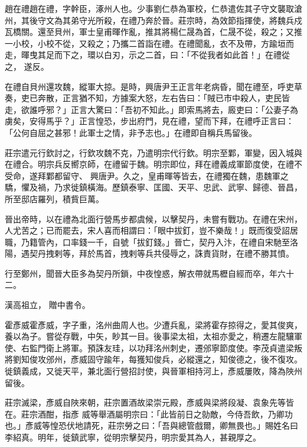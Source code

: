 
\begin{pinyinscope}

 趙在禮趙在禮，字幹臣，涿州人也。少事劉仁恭為軍校，仁恭遣佐其子守文襲取滄州，其後守文為其弟守光所殺，在禮乃奔於晉。莊宗時，為效節指揮使，將魏兵戍瓦橋關。還至貝州，軍士皇甫暉作亂，推其將楊仁晟為首，仁晟不從，殺之；又推一小校，小校不從，又殺之；乃攜二首詣在禮。在禮聞亂，衣不及帶，方踰垣而走，暉曳其足而下之，環以白刃，示之二首，曰：「不從我者如此首！」在禮從之，
 遂反。



 在禮自貝州還攻魏，縱軍大掠。是時，興唐尹王正言年老病昏，聞在禮至，呼吏草奏，吏已奔散，正言猶不知，方據案大怒，左右告曰：「賊已市中殺人，吏民皆走，欲誰呼邪？」正言大驚曰：「吾初不知此。」即索馬將去，廄吏曰：「公妻子為虜矣，安得馬乎？」正言惶恐，步出府門，見在禮，望而下拜，在禮呼正言曰：「公何自屈之甚邪！此軍士之情，非予志也。」在禮即自稱兵馬留後。



 莊宗遣元行欽討之，行欽攻魏不克，乃遣明宗代行欽。明宗至鄴，軍變，因入城與在禮合。明宗兵反嚮京師，在禮留于魏。明宗即位，拜在禮義成軍節度使，在禮不受命，遂拜鄴都留守、
 興唐尹。久之，皇甫暉等皆去，在禮獨在魏，患魏軍之驕，懼及禍，乃求徙鎮橫海。歷鎮泰寧、匡國、天平、忠武、武寧、歸德、晉昌，所至邸店羅列，積貲巨萬。



 晉出帝時，以在禮為北面行營馬步都虞候，以擊契丹，未嘗有戰功。在禮在宋州，人尤苦之；已而罷去，宋人喜而相謂曰：「眼中拔釘，豈不樂哉！」既而復受詔居職，乃籍管內，口率錢一千，自號「拔釘錢。」晉亡，契丹入汴，在禮自宋馳至洛陽，遇契丹拽剌等，拜於馬首，拽剌等兵共侵辱之，誅責貨財，在禮不勝其憤。



 行至鄭州，聞晉大臣多為契丹所鎖，中夜惶惑，解衣帶就馬櫪自經而卒，年六十二。



 漢高祖立，
 贈中書令。



 霍彥威霍彥威，字子重，洺州曲周人也。少遭兵亂，梁將霍存掠得之，愛其俊爽，養以為子。嘗從存戰，中矢，眇其一目。後事梁太祖，太祖亦愛之，稍遷左龍驤軍使、右監門衛上將軍。預誅友珪，以功拜洺州刺史，遷邠寧節度使。李茂貞遣梁叛將劉知俊攻邠州，彥威固守踰年，每獲知俊兵，必縱還之，知俊德之，後不復攻。徙鎮義成，又徙天平，兼北面行營招討使，與晉軍相持河上，彥威屢敗，降為陜州留後。



 莊宗滅梁，彥威自陜來朝，莊宗置酒故梁崇元殿，彥威與梁將段凝、袁象先等皆在。莊宗酒酣，指彥
 威等舉酒屬明宗曰：「此皆前日之勍敵，今侍吾飲，乃卿功也。」彥威等惶恐伏地請死，莊宗勞之曰：「吾與總管戲爾，卿無畏也。」賜姓名曰李紹真。明年，徙鎮武寧，從明宗擊契丹，明宗愛其為人，甚親厚之。




\end{pinyinscope}
